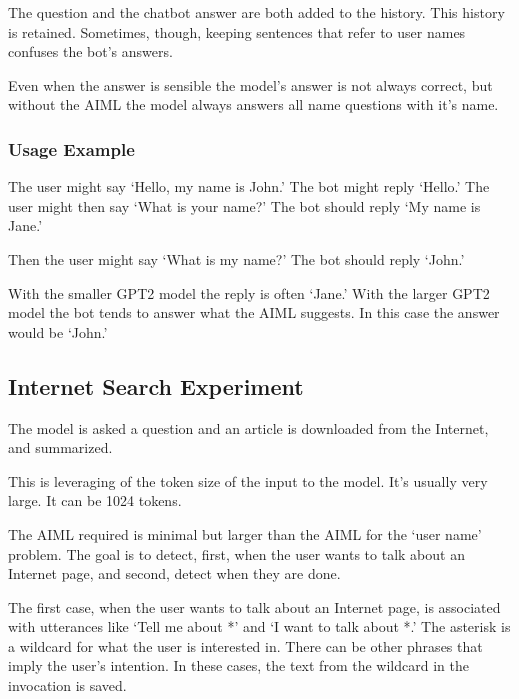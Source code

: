 The question and the chatbot answer are both added to the history. 
This history is retained. 
Sometimes, though, keeping sentences that refer to user names confuses the bot's answers.%

Even when the answer is sensible the model's answer is not always correct, but without the AIML the model always answers all name questions with it's name. 


\subsubsection{Usage Example}

The user might say `Hello, my name is John.' The bot might reply `Hello.' The user might then say `What is your name?' The bot should reply `My name is Jane.'

Then the user might say `What is my name?' The bot should reply `John.'

With the smaller GPT2 model the reply is often `Jane.' %
With the larger GPT2 model the bot tends to answer what the AIML suggests. In this case the answer would be `John.'

\subsection{Internet Search Experiment}
The model is asked a question and an article is downloaded from the Internet, and summarized. %

This is leveraging of the token size of the input to the model. It's usually very large. It can be 1024 tokens.

The AIML required is minimal but larger than the AIML for the `user name' problem. The goal is to detect, first, when the user wants to talk about an Internet page, and second, detect when they are done.

The first case, when the user wants to talk about an Internet page, is associated with utterances like `Tell me about *' and `I want to talk about *.' The asterisk is a wildcard for what the user is interested in. There can be other phrases that imply the user's intention. In these cases, the text from the wildcard in the invocation is saved.

